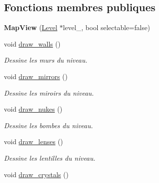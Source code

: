 \subsection*{Fonctions membres publiques}
\begin{DoxyCompactItemize}
\item 
\hypertarget{classMapView_af0587bbc403c323417ea227d247c02c6}{{\bfseries Map\+View} (\hyperlink{classLevel}{Level} $\ast$level\+\_\+, bool selectable=false)}\label{classMapView_af0587bbc403c323417ea227d247c02c6}

\item 
\hypertarget{classMapView_a9243e834166e90fd20bba175fa56a4cc}{void \hyperlink{classMapView_a9243e834166e90fd20bba175fa56a4cc}{draw\+\_\+walls} ()}\label{classMapView_a9243e834166e90fd20bba175fa56a4cc}

\begin{DoxyCompactList}\small\item\em Dessine les murs du niveau. \end{DoxyCompactList}\item 
\hypertarget{classMapView_abb3bba1e54932fc2b64406995881c4ad}{void \hyperlink{classMapView_abb3bba1e54932fc2b64406995881c4ad}{draw\+\_\+mirrors} ()}\label{classMapView_abb3bba1e54932fc2b64406995881c4ad}

\begin{DoxyCompactList}\small\item\em Dessine les miroirs du niveau. \end{DoxyCompactList}\item 
\hypertarget{classMapView_aafe3dc35cb0938ae7e778b3ddbaf0d87}{void \hyperlink{classMapView_aafe3dc35cb0938ae7e778b3ddbaf0d87}{draw\+\_\+nukes} ()}\label{classMapView_aafe3dc35cb0938ae7e778b3ddbaf0d87}

\begin{DoxyCompactList}\small\item\em Dessine les bombes du niveau. \end{DoxyCompactList}\item 
\hypertarget{classMapView_a636b68282c90dab40dba5984acae2605}{void \hyperlink{classMapView_a636b68282c90dab40dba5984acae2605}{draw\+\_\+lenses} ()}\label{classMapView_a636b68282c90dab40dba5984acae2605}

\begin{DoxyCompactList}\small\item\em Dessine les lentilles du niveau. \end{DoxyCompactList}\item 
\hypertarget{classMapView_a69e182926c3faeccd627740329451091}{void \hyperlink{classMapView_a69e182926c3faeccd627740329451091}{draw\+\_\+crystals} ()}\label{classMapView_a69e182926c3faeccd627740329451091}


\end{DoxyCompactItemize}
